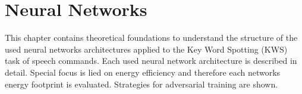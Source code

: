 
\chapter{Neural Networks}\label{sec:nn}
This chapter contains theoretical foundations to understand the structure of the used neural networks architectures applied to the Key Word Spotting (KWS) task of speech commands.
Each used neural network architecture is described in detail.
Special focus is lied on energy efficiency and therefore each networks energy footprint is evaluated.
Strategies for adversarial training are shown.





